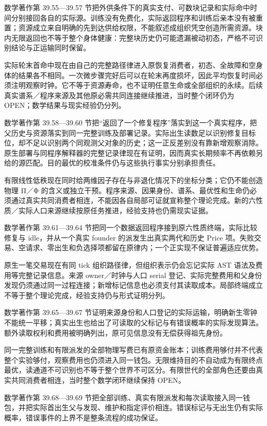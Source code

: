 \documentclass[
  11pt,
  oneside]{book}
\begin{document}
数学著作第 39.55---39.57 节把外供条件下的真实支付、可数块记录和实际命中时间分别接回各自的实际源。训练没有免费化，实际返回程序和训练后亲本没有被重置；资源成立来自明确的先到达供给权限，不能叙述成组织凭空创造所需资源。块内无限返回也不等于整个身体健康：完整块历史仍可能遗漏被动初态，严格不可识别结论与正运输同时保留。

实际轮末首命中现在由自己的完整路径律进入原恢复消费者，初态、全故障和空身体的结果各不相同。一次微步骤完好后可以在轮末再度损坏，因此平均恢复时间必须注明观察时钟。它不等于资源寿命，也不证明任意生命或全部组织的永续。后续真实谱系／程序来源及其他原必需共同连接继续推进，当时整个闭环仍为 OPEN；数学结果与现实经验仍分列。

数学著作第 39.58---39.60 节把``返回了一个修复程序''落实到这一个真实程序，把父历史与资源落实到同一完整训练及部署记录。实际出生读数足以识别修复目标位，却不足以识别两个同观测父对象的历史；这一正反差别没有靠新增观察消除。原生部署与同程序解释器的完整记录律现在有证明，因而真实长期频率不再依赖另给的源匹配。目的最优的校准条件仍与这些执行事实分别承担责任。

有限线性低秩现在同时给两维因子存在与非退化情况下的坐标分类；它仍不能创造物理 Π／Φ 的含义或独立干预。程序来源、因果身份、谱系、最优性和生命仍必须通过真实共同消费者相连，不能因各自局部可证就宣称整个理论完成。新的六性质／实际人口来源继续按原任务推进，经验支持也仍需现实证据。

数学著作第 39.61---39.64 节把同一个数据返回程序接到原六性质终端，实际比较修复与 idle，并从一个真实 founder 的派发生出真实两代和历史 Price 项。失败交易、空请求、零出生和负选择项都留在原律内；一个正实现不保证普遍适应优势。

原生一笔交易现在有同 tick 组织路径律，但组织表示仍会忘记实际 AST 语法及费用等完整记录信息。来源 owner／时钟与人口 serial 登记、实际完整费用和父身份发现仍须通过同一过程连接；新增标记信息也必须支付其读取成本。局部终端成立不等于整个理论完成，经验支持仍与形式证明分列。

数学著作第 39.65---39.67 节证明来源身份和人口登记的实际运输，明确新生零钟不能统一平移；真实出生也给出了可读取的父标记与有错误概率的实际发现算法。额外读取权利和费用被明确列出，原可见信息没有无偿获得祖先身份。

同一完整训练和有限派发的全部物理写费已有原资金账本；训练费用够付并不代表整个实验够付，观察费用也仍须进入同一钱包。无限维持目的不自动成为有限终点最优，读通道不可识别也不等于整个世界不可区分。有限世代的全部角色还要由真实共同消费者相连，当时整个数学闭环继续保持 OPEN。

数学著作第 39.68---39.69 节把全部训练、真实有限派发和每次读取接入同一钱包，并把实际首出生父与发现、维护和指定评价相连。错误标记与无出生仍有实际概率，错误事件的上界不是整条流程的成功保证。
\end{document}
